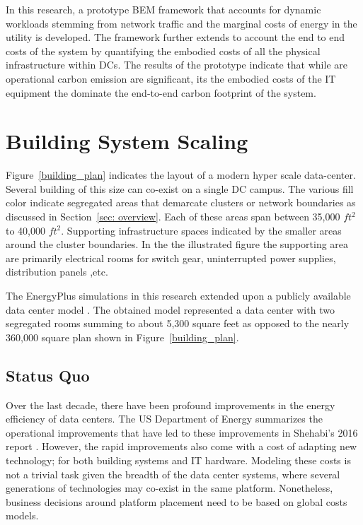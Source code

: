 In this research, a prototype BEM framework that accounts for dynamic workloads stemming from network traffic and the marginal costs of energy in the utility is developed. The framework further extends to account the end to end costs of the system by quantifying the embodied costs of all the physical infrastructure within DCs. The results of the prototype indicate that while are operational carbon emission are significant, its the embodied costs of the IT equipment the dominate the end-to-end carbon footprint of the system.

\section{Building System Scaling}
Figure~\ref{building_plan} indicates the layout of a modern hyper scale data-center. Several building of this size can co-exist on a single DC campus. The various fill color indicate segregated areas that demarcate clusters or network boundaries as discussed in Section~\ref{sec: overview}. Each of these areas span between 35,000 $ft^2$ to 40,000 $ft^2$. Supporting infrastructure spaces indicated by the smaller areas around the cluster boundaries. In the the illustrated figure the supporting area are primarily electrical rooms for switch gear, uninterrupted power supplies, distribution panels ,etc.

The EnergyPlus simulations in this research extended upon a publicly available data center model \cite{moriyama18}. The obtained model represented a data center with two segregated rooms summing to about 5,300 square feet as opposed to the nearly 360,000 square plan shown in Figure~\ref{building_plan}. 



\subsection{Status Quo}
Over the last decade, there have been profound improvements in the energy efficiency of data centers. The US Department of Energy summarizes the operational improvements that have led to these improvements in Shehabi's 2016 report \cite{Shehabi16}. However, the rapid improvements also come with a cost of adapting new technology; for both building systems and IT hardware. Modeling these costs is not a trivial task given the breadth of the data center systems, where several generations of technologies may co-exist in the same platform. Nonetheless, business decisions around platform placement need to be based on global costs models. 

